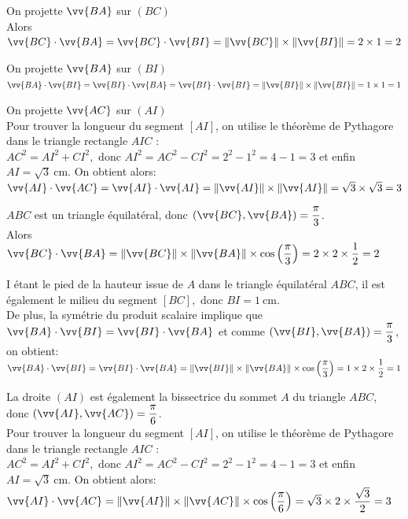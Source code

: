 \documentclass[11pt,a4paper]{article}  %
\begin{document}
\begin{corrBox}
\begin{enumMet}
	\item On projette $\vv{BA}$ sur $(BC)$\\
	Alors $\vv{B C} \cdot \vv{B A}=\vv{B C} \cdot \vv{B I}=\|\vv{B C}\| \times\|\vv{B I}\|=2 \times 1=2$
	\item On projette $\vv{BA}$ sur $(BI)$\\
	$\vv{B A} \cdot \vv{B I}=\vv{B I} \cdot \vv{B A}=\vv{B I} \cdot \vv{B I}=\|\vv{B I}\| \times\|\vv{B I}\|=1 \times 1=1$
	\item On projette $\vv{AC}$ sur $(AI)$\\
	Pour trouver la longueur du segment $[A I]$, on utilise le théorème de Pythagore dans le triangle rectangle $A I C$ :\\
	$A C^{2}=A I^{2}+C I^{2},$ donc $A I^{2}=A C^{2}-C I^{2}=2^{2}-1^{2}=4-1=3$ et enfin
	$A I=\sqrt{3} \mathrm{~cm} .$ On obtient alors:\\
	$\vv{A I} \cdot \vv{A C}=\vv{A I} \cdot \vv{A I}=\|\vv{A I}\| \times\|\vv{A I}\| =\sqrt{3} \times \sqrt{3}=3$
\end{enumMet}	
\begin{enumMet}
	\item $A B C$ est un triangle équilatéral, donc $(\vv{B C}, \vv{B A})=\dfrac{\pi}{3}$.\\
	Alors $\vv{B C} \cdot \vv{B A}=\|\vv{B C}\| \times\|\vv{B A}\| \times \cos \left(\dfrac{\pi}{3}\right)=2 \times 2 \times \dfrac{1}{2}=2$
	\item I étant le pied de la hauteur issue de $A$ dans le triangle équilatéral $A B C$, il est également le milieu du segment $[B C],$ donc $B I=1 \mathrm{~cm}$.\\
	De plus, la symétrie du produit scalaire implique que $\vv{B A} \cdot \vv{B I}=\vv{B I} \cdot \vv{B A}$ et comme $(\vv{B I}, \vv{B A})=\dfrac{\pi}{3}$, on obtient:\\
	$\vv{B A} \cdot \vv{B I}=\vv{B I} \cdot \vv{B A}=\|\vv{B I}\| \times\|\vv{B A}\| \times \cos \left(\dfrac{\pi}{3}\right)=1 \times 2 \times \dfrac{1}{2}=1$
	\item La droite $(A I)$ est également la bissectrice du sommet $A$ du triangle $A B C$, donc $(\vv{A I}, \vv{A C})=\dfrac{\pi}{6}$.\\
	Pour trouver la longueur du segment $[A I]$, on utilise le théorème de Pythagore dans le triangle rectangle $A I C$ :\\
	$A C^{2}=A I^{2}+C I^{2},$ donc $A I^{2}=A C^{2}-C I^{2}=2^{2}-1^{2}=4-1=3$ et enfin
	$A I=\sqrt{3} \mathrm{~cm} .$ On obtient alors:\\
	$\vv{A I} \cdot \vv{A C}=\|\vv{A I}\| \times\|\vv{A C}\| \times \cos \left(\dfrac{\pi}{6}\right)=\sqrt{3} \times 2 \times \dfrac{\sqrt{3}}{2}=3$
\end{enumMet}	
\end{corrBox}
\end{document}
